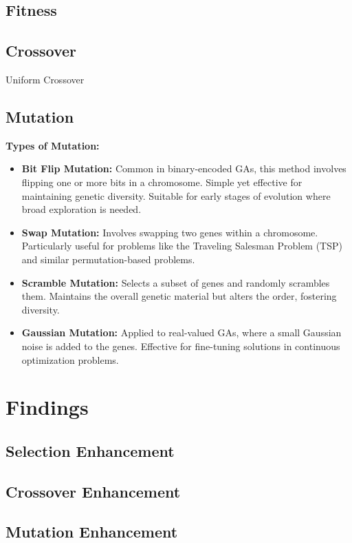 \documentclass[a4paper, twocolumn]{article}
\begin{document}
\subsection{Fitness\label{sec:Fitness}}
\subsection{Crossover\label{sec:Crossover}}
Uniform Crossover

\subsection{Mutation\label{sec:Mutation}}

\textbf{Types of Mutation:}
\begin{itemize}
    \item \textbf{Bit Flip Mutation:} Common in binary-encoded GAs, this method involves flipping one or more bits in a chromosome. Simple yet effective for maintaining genetic diversity. Suitable for early stages of evolution where broad exploration is needed.
    \item \textbf{Swap Mutation:} Involves swapping two genes within a chromosome. Particularly useful for problems like the Traveling Salesman Problem (TSP) and similar permutation-based problems.
    \item \textbf{Scramble Mutation:} Selects a subset of genes and randomly scrambles them. Maintains the overall genetic material but alters the order, fostering diversity.
    \item \textbf{Gaussian Mutation:} Applied to real-valued GAs, where a small Gaussian noise is added to the genes. Effective for fine-tuning solutions in continuous optimization problems.
\end{itemize}

\section{Findings\label{sec:Findings}}
\subsection{Selection Enhancement\label{sec:Selection Enhancement}}
\subsection{Crossover Enhancement\label{sec:Crossover Enhancement}}
\subsection{Mutation Enhancement\label{sec:Mutation Enhancement}}
\printbibliography
\end{document}
